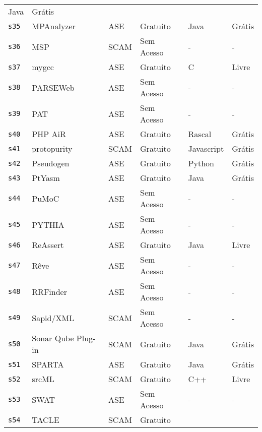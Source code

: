 \begin{longtable}{l l l l p{3cm} l}
      Java &
      Grátis \\
    \texttt{s35} &
      MPAnalyzer &
      ASE &
      Gratuito &
      Java &
      Grátis \\
    \texttt{s36} &
      MSP &
      SCAM &
      Sem Acesso &
      - &
      - \\
    \texttt{s37} &
      mygcc &
      ASE &
      Gratuito &
      C &
      Livre \\
    \texttt{s38} &
      PARSEWeb &
      ASE &
      Sem Acesso &
      - &
      - \\
    \texttt{s39} &
      PAT &
      ASE &
      Sem Acesso &
      - &
      - \\
    \texttt{s40} &
      PHP AiR &
      ASE &
      Gratuito &
      Rascal &
      Grátis \\
    \texttt{s41} &
      protopurity &
      SCAM &
      Gratuito &
      Javascript &
      Grátis \\
    \texttt{s42} &
      Pseudogen &
      ASE &
      Gratuito &
      Python &
      Grátis \\
    \texttt{s43} &
      PtYasm &
      ASE &
      Gratuito &
      Java &
      Grátis \\
    \texttt{s44} &
      PuMoC &
      ASE &
      Sem Acesso &
      - &
      - \\
    \texttt{s45} &
      PYTHIA &
      ASE &
      Sem Acesso &
      - &
      - \\
    \texttt{s46} &
      ReAssert &
      ASE &
      Gratuito &
      Java &
      Livre \\
    \texttt{s47} &
      Rêve &
      ASE &
      Sem Acesso &
      - &
      - \\
    \texttt{s48} &
      RRFinder &
      ASE &
      Sem Acesso &
      - &
      - \\
    \texttt{s49} &
      Sapid/XML &
      SCAM &
      Sem Acesso &
      - &
      - \\
    \texttt{s50} &
      Sonar Qube Plug-in &
      SCAM &
      Gratuito &
      Java &
      Grátis \\
    \texttt{s51} &
      SPARTA &
      ASE &
      Gratuito &
      Java &
      Grátis \\
    \texttt{s52} &
      srcML &
      SCAM &
      Gratuito &
      C++ &
      Livre \\
    \texttt{s53} &
      SWAT &
      ASE &
      Sem Acesso &
      - &
      - \\
    \texttt{s54} &
      TACLE &
      SCAM &
      Gratuito &

\end{longtable}
